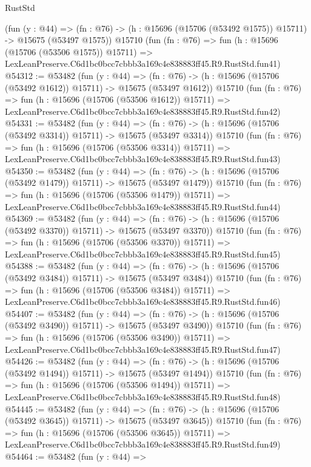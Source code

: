 \begin{lexlean}{RustStd}
\begin{coremodule}
    (fun (y : @44) =>
    (fn : @76) -> (h : @15696 (@15706 (@53492 @1575)) @15711) -> @15675 (@53497 @1575))
    @15710
    (fun (fn : @76) =>
    fun (h : @15696 (@15706 (@53506 @1575)) @15711) =>
    LexLeanPreserve.C6d1bc0bcc7cbbb3a169c4e838883ff45.R9.RustStd.fun41)
@54312 := @53482
    (fun (y : @44) =>
    (fn : @76) -> (h : @15696 (@15706 (@53492 @1612)) @15711) -> @15675 (@53497 @1612))
    @15710
    (fun (fn : @76) =>
    fun (h : @15696 (@15706 (@53506 @1612)) @15711) =>
    LexLeanPreserve.C6d1bc0bcc7cbbb3a169c4e838883ff45.R9.RustStd.fun42)
@54331 := @53482
    (fun (y : @44) =>
    (fn : @76) -> (h : @15696 (@15706 (@53492 @3314)) @15711) -> @15675 (@53497 @3314))
    @15710
    (fun (fn : @76) =>
    fun (h : @15696 (@15706 (@53506 @3314)) @15711) =>
    LexLeanPreserve.C6d1bc0bcc7cbbb3a169c4e838883ff45.R9.RustStd.fun43)
@54350 := @53482
    (fun (y : @44) =>
    (fn : @76) -> (h : @15696 (@15706 (@53492 @1479)) @15711) -> @15675 (@53497 @1479))
    @15710
    (fun (fn : @76) =>
    fun (h : @15696 (@15706 (@53506 @1479)) @15711) =>
    LexLeanPreserve.C6d1bc0bcc7cbbb3a169c4e838883ff45.R9.RustStd.fun44)
@54369 := @53482
    (fun (y : @44) =>
    (fn : @76) -> (h : @15696 (@15706 (@53492 @3370)) @15711) -> @15675 (@53497 @3370))
    @15710
    (fun (fn : @76) =>
    fun (h : @15696 (@15706 (@53506 @3370)) @15711) =>
    LexLeanPreserve.C6d1bc0bcc7cbbb3a169c4e838883ff45.R9.RustStd.fun45)
@54388 := @53482
    (fun (y : @44) =>
    (fn : @76) -> (h : @15696 (@15706 (@53492 @3484)) @15711) -> @15675 (@53497 @3484))
    @15710
    (fun (fn : @76) =>
    fun (h : @15696 (@15706 (@53506 @3484)) @15711) =>
    LexLeanPreserve.C6d1bc0bcc7cbbb3a169c4e838883ff45.R9.RustStd.fun46)
@54407 := @53482
    (fun (y : @44) =>
    (fn : @76) -> (h : @15696 (@15706 (@53492 @3490)) @15711) -> @15675 (@53497 @3490))
    @15710
    (fun (fn : @76) =>
    fun (h : @15696 (@15706 (@53506 @3490)) @15711) =>
    LexLeanPreserve.C6d1bc0bcc7cbbb3a169c4e838883ff45.R9.RustStd.fun47)
@54426 := @53482
    (fun (y : @44) =>
    (fn : @76) -> (h : @15696 (@15706 (@53492 @1494)) @15711) -> @15675 (@53497 @1494))
    @15710
    (fun (fn : @76) =>
    fun (h : @15696 (@15706 (@53506 @1494)) @15711) =>
    LexLeanPreserve.C6d1bc0bcc7cbbb3a169c4e838883ff45.R9.RustStd.fun48)
@54445 := @53482
    (fun (y : @44) =>
    (fn : @76) -> (h : @15696 (@15706 (@53492 @3645)) @15711) -> @15675 (@53497 @3645))
    @15710
    (fun (fn : @76) =>
    fun (h : @15696 (@15706 (@53506 @3645)) @15711) =>
    LexLeanPreserve.C6d1bc0bcc7cbbb3a169c4e838883ff45.R9.RustStd.fun49)
@54464 := @53482
    (fun (y : @44) =>

\end{coremodule}
\end{lexlean}
